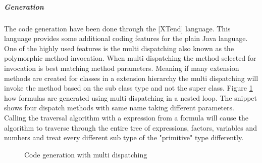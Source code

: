 \subparagraph{Generation}
The code generation have been done through the [XTend] language.
This language provides some additional coding features for the plain Java language.
One of the highly used features is the multi dispatching also known as the polymorphic method invocation.
When multi dispatching the method selected for invocation is best matching method parameters. 
Meaning if many extension methods are created for classes in a extension hierarchy the multi dispatching will invoke the method based on the sub class type and not the super class.
Figure \ref{fig:multidispatching} how formulas are generated using multi dispatching in a nested loop.
The snippet shows four dispatch methods with same name taking different parameters.
Calling the traversal algorithm with a expression from a formula will cause the algorithm to traverse through the entire tree of expressions, factors, variables and numbers and treat every different sub type of the "primitive" type differently.

\begin{figure}
\begin{center}

\end{center}
\caption{Code generation with multi dispatching}
\label{fig:multidispatching}
\end{figure}

